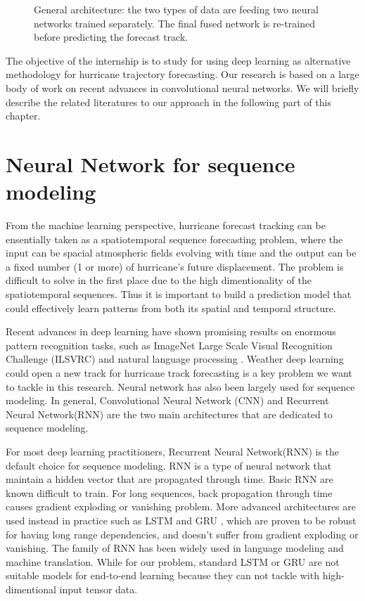 \begin{figure}[H]
	\begin{center}
		\hsize {}
	\end{center}
	\caption{General architecture: the two types of data are feeding two neural networks trained separately. The final fused network is re-trained before predicting the forecast track. }
	\label{fig::task}
\end{figure}

The objective of the internship is to study for using deep learning as alternative methodology for hurricane trajectory forecasting. Our research is based on a large body of work on recent advances in convolutional neural networks. We will briefly describe the related literatures to our approach in the following part of this chapter.  

\section{Neural Network for sequence modeling}
From the machine learning perspective, hurricane forecast tracking can be ensentially taken as a spatiotemporal sequence forecasting problem, where the input can be spacial atmospheric fields evolving with time and the output can be a fixed number (1 or more) of hurricane's future displacement. The problem is difficult to solve in the first place due to the high dimentionality of the spatiotemporal sequences. Thus it is important to build a prediction model that could effectively learn patterns from both its spatial and temporal structure. 

Recent advances in deep learning have shown promising results on enormous pattern recognition tasks, such as ImageNet Large Scale Visual Recognition Challenge (ILSVRC) \cite{russakovsky2015imagenet} \cite{krizhevsky2012imagenet}  \cite{szegedy2015going} and natural language processing \cite{goldberg2014word2vec} \cite{sutskever2014sequence}. Weather deep learning could open a new track for hurricane track forecasting is a key problem we want to tackle in this research. Neural network has also been largely used for sequence modeling. In general, Convolutional Neural Network (CNN) and Recurrent Neural Network(RNN) are the two main architectures that are dedicated to sequence modeling. 

For most deep learning practitioners, Recurrent Neural Network(RNN) is the default choice for sequence modeling. RNN is a type of neural network that maintain a hidden vector that are propagated through time. Basic RNN are known difficult to train. For long sequences, back propagation through time causes gradient exploding or vanishing problem. More advanced architectures are used instead in practice such as LSTM\cite{hochreiter1997long} and GRU \cite{collobert2008unified}, which are proven to be robust for having long range dependencies, and doesn't suffer from gradient exploding or vanishing. The family of RNN has been widely used in language modeling\cite{graves2013generating} and machine translation\cite{sutskever2014sequence}.  While for our problem, standard LSTM or GRU are not suitable models for end-to-end learning because they can not tackle with high-dimentional input tensor data. 

